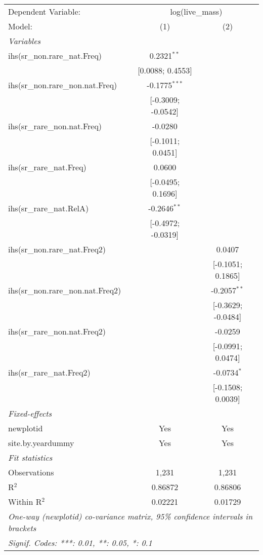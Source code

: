 \begin{tabular}{lcc}
\tabularnewline\midrule\midrule
Dependent Variable:&\multicolumn{2}{c}{log(live\_mass)}\\
Model:&(1) & (2)\\
\midrule \emph{Variables}&   &  \\
ihs(sr\_non.rare\_nat.Freq)&0.2321$^{**}$ &   \\
  &[0.0088; 0.4553] &   \\
ihs(sr\_non.rare\_non.nat.Freq)&-0.1775$^{***}$ &   \\
  &[-0.3009; -0.0542] &   \\
ihs(sr\_rare\_non.nat.Freq)&-0.0280 &   \\
  &[-0.1011; 0.0451] &   \\
ihs(sr\_rare\_nat.Freq)&0.0600 &   \\
  &[-0.0495; 0.1696] &   \\
ihs(sr\_rare\_nat.RelA)&-0.2646$^{**}$ &   \\
  &[-0.4972; -0.0319] &   \\
ihs(sr\_non.rare\_nat.Freq2)&   & 0.0407\\
  &   & [-0.1051; 0.1865]\\
ihs(sr\_non.rare\_non.nat.Freq2)&   & -0.2057$^{**}$\\
  &   & [-0.3629; -0.0484]\\
ihs(sr\_rare\_non.nat.Freq2)&   & -0.0259\\
  &   & [-0.0991; 0.0474]\\
ihs(sr\_rare\_nat.Freq2)&   & -0.0734$^{*}$\\
  &   & [-0.1508; 0.0039]\\
\midrule \emph{Fixed-effects}&   &  \\
newplotid & Yes & Yes\\
site.by.yeardummy & Yes & Yes\\
\midrule \emph{Fit statistics}&  & \\
Observations & 1,231&1,231\\
R$^2$ & 0.86872&0.86806\\
Within R$^2$ & 0.02221&0.01729\\
\midrule\midrule\multicolumn{3}{l}{\emph{One-way (newplotid) co-variance matrix, 95\% confidence intervals in brackets}}\\
\multicolumn{3}{l}{\emph{Signif. Codes: ***: 0.01, **: 0.05, *: 0.1}}\\
\end{tabular}


